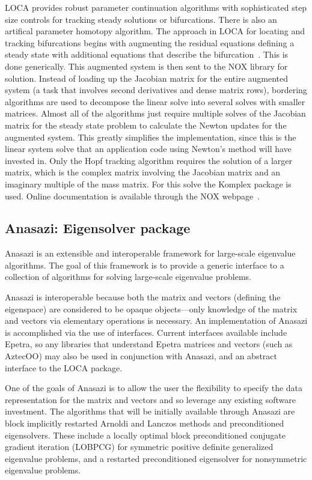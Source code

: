 \documentclass[12pt,relax]{TrilinosOverview}
\begin{document}
LOCA provides robust parameter continuation algorithms 
with sophisticated step size controls for tracking steady
solutions or bifurcations. There is also an
artifical parameter homotopy algorithm.
The approach in LOCA for locating and tracking bifurcations begins with augmenting 
the residual equations defining a steady state with additional equations that 
describe the bifurcation~\cite{LOCA-manual}. This is done generically. This 
augmented system is then sent to the NOX library for solution.
Instead of loading up the Jacobian matrix for the entire 
augmented system (a task that involves second derivatives and dense matrix rows), 
bordering algorithms are used to decompose the linear solve into several solves 
with smaller matrices. Almost all of the algorithms just require multiple solves 
of the Jacobian matrix for the steady state problem to calculate the Newton 
updates for the augmented system. This greatly simplifies the implementation, 
since this is the linear system solve that an application code using Newton's 
method will have invested in. Only the Hopf tracking algorithm requires 
the solution of a larger matrix, which is the complex matrix involving the 
Jacobian matrix and an imaginary multiple of the mass matrix. For this solve
the Komplex package is used. Online documentation is available
through the NOX webpage~\cite{NOX-home-page}.

\subsection{Anasazi: Eigensolver package}


Anasazi is an extensible and interoperable framework for 
large-scale eigenvalue algorithms.  The goal of this 
framework is to provide a generic interface to a collection 
of algorithms for solving large-scale eigenvalue problems. 

Anasazi is interoperable because both the matrix and vectors (defining the
eigenspace) are considered to be opaque objects---only knowledge of the matrix and
vectors via elementary operations is necessary. An implementation of Anasazi
is accomplished via the use of interfaces. Current interfaces available include
Epetra, so any libraries that understand Epetra matrices and vectors (such
as AztecOO) may also be used in conjunction with Anasazi, and an abstract interface
to the LOCA package.

One of the goals of Anasazi is to allow the user the flexibility 
to specify the data representation for the matrix and vectors and 
so leverage any existing software
investment. The algorithms that will be initially available through 
Anasazi are block implicitly restarted Arnoldi and Lanczos methods 
and preconditioned eigensolvers.
These include a locally optimal block preconditioned conjugate 
gradient iteration  (LOBPCG) for symmetric positive definite 
generalized eigenvalue problems, and a 
restarted preconditioned eigensolver for nonsymmetric eigenvalue problems.
\end{document}
